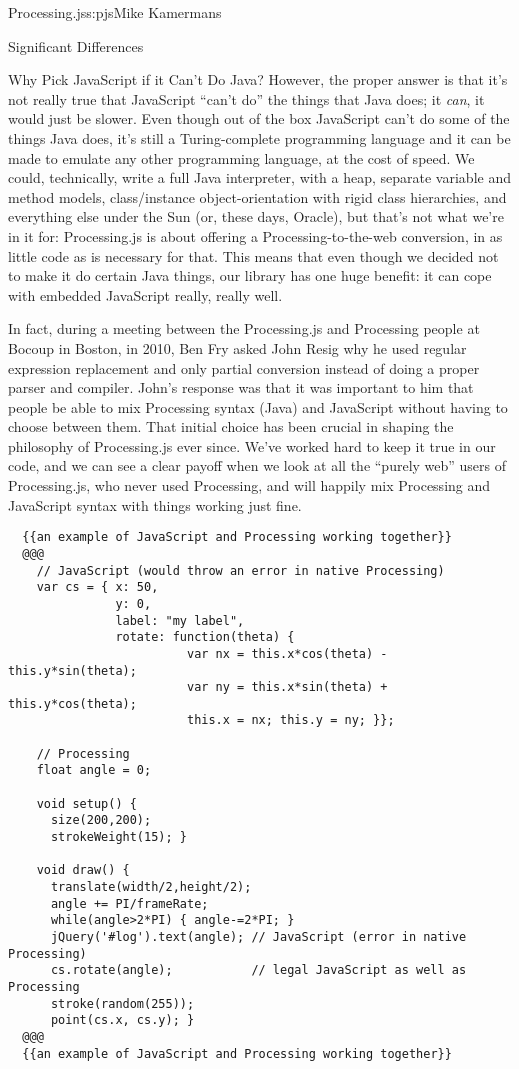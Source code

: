 \begin{aosachapter}{Processing.js}{s:pjs}{Mike Kamermans}
\begin{aosasect1}{Significant Differences}
\begin{aosasect2}{Why Pick JavaScript if it Can't Do Java?}
However, the proper answer is that it's not really true that
JavaScript ``can't do'' the things that Java does; it \emph{can}, it would
just be slower. Even though out of the box JavaScript can't do some of
the things Java does, it's still a Turing-complete programming
language and it can be made to emulate any other programming language,
at the cost of speed. We could, technically, write a full Java
interpreter, with a  heap, separate variable and method models,
class/instance object-orientation with rigid class hierarchies,
and everything else under the Sun (or, these days, Oracle), but that's
not what we're in it for: Processing.js is about offering a
Processing-to-the-web conversion, in as little code as is necessary
for that. This means that even though we decided not to make it do
certain Java things, our library has one huge benefit: it can cope
with embedded JavaScript really, really well.

In fact, during a meeting between the Processing.js and Processing
people at Bocoup in Boston, in 2010, Ben Fry asked John Resig why he
used regular expression replacement and only partial conversion
instead of doing a proper parser and compiler. John's response was
that it was important to him that people be able to mix Processing
syntax (Java) and JavaScript without having to choose between
them. That initial choice has been crucial in shaping the philosophy
of Processing.js ever since. We've worked hard to keep it true in our
code, and we can see a clear payoff when we look at all the ``purely
web'' users of Processing.js, who never used Processing, and will
happily mix Processing and JavaScript syntax with things working just
fine.

\begin{verbatim}
  {{an example of JavaScript and Processing working together}}
  @@@
    // JavaScript (would throw an error in native Processing)
    var cs = { x: 50,
               y: 0,
               label: "my label",
               rotate: function(theta) {
                         var nx = this.x*cos(theta) - this.y*sin(theta);
                         var ny = this.x*sin(theta) + this.y*cos(theta);
                         this.x = nx; this.y = ny; }};

    // Processing
    float angle = 0;

    void setup() {
      size(200,200);
      strokeWeight(15); }

    void draw() {
      translate(width/2,height/2);
      angle += PI/frameRate;
      while(angle>2*PI) { angle-=2*PI; }
      jQuery('#log').text(angle); // JavaScript (error in native Processing)
      cs.rotate(angle);           // legal JavaScript as well as Processing
      stroke(random(255));
      point(cs.x, cs.y); }
  @@@
  {{an example of JavaScript and Processing working together}}
\end{verbatim}


\end{aosasect2}
\end{aosasect1}
\end{aosachapter}
